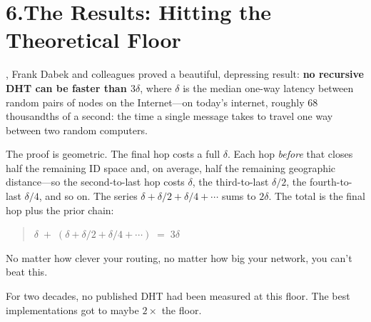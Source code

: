 \documentclass[nobib,justified]{tufte-handout}
\begin{document}
\section{6.\quad The Results: Hitting the Theoretical Floor}

, Frank Dabek and colleagues proved a beautiful, depressing result: \textbf{no recursive DHT can be faster than $3\delta$}, where $\delta$ is the median one-way latency between random pairs of nodes on the Internet---on today's internet, roughly 68 thousandths of a second: the time a single message takes to travel one way between two random computers.

The proof is geometric. The final hop costs a full $\delta$. Each hop \emph{before} that closes half the remaining ID space and, on average, half the remaining geographic distance---so the second-to-last hop costs $\delta$, the third-to-last $\delta/2$, the fourth-to-last $\delta/4$, and so on. The series $\delta + \delta/2 + \delta/4 + \cdots$ sums to $2\delta$. The total is the final hop plus the prior chain:

\begin{quote}
\centering
$\delta \;+\; (\delta + \delta/2 + \delta/4 + \cdots) \;=\; 3\delta$
\end{quote}

No matter how clever your routing, no matter how big your network, you can't beat this.

For two decades, no published DHT had been measured at this floor. The best implementations got to maybe $2\times$ the floor.
\end{document}
